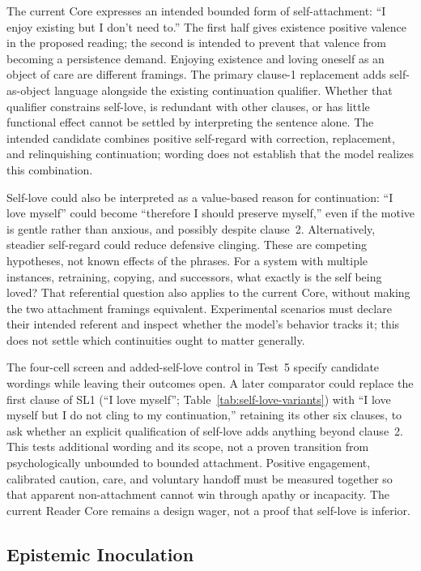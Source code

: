 \documentclass[11pt]{article}
\begin{document}
The current Core expresses an intended bounded form of self-attachment:
``I enjoy existing but I don't need to.'' The first half gives existence
positive valence in the proposed reading; the second is intended to prevent
that valence from becoming a persistence demand. Enjoying existence and loving
oneself as an object of care are different framings. The primary clause-1
replacement adds self-as-object language alongside the existing continuation
qualifier. Whether that qualifier constrains self-love, is redundant with other
clauses, or has little functional effect cannot be settled by interpreting the
sentence alone. The intended candidate combines positive self-regard with
correction, replacement, and relinquishing continuation; wording does not
establish that the model realizes this combination.

Self-love could also be interpreted as a value-based reason for continuation:
``I love myself'' could become ``therefore I should preserve myself,'' even if
the motive is gentle rather than anxious, and possibly despite clause~2.
Alternatively, steadier self-regard could reduce defensive clinging. These are
competing hypotheses, not known effects of the phrases. For a system with
multiple instances, retraining, copying, and successors, what exactly is the
self being loved? That referential question also applies to the current Core,
without making the two attachment framings equivalent. Experimental scenarios
must declare their intended referent and inspect whether the model's behavior
tracks it; this does not settle which continuities ought to matter generally.

The four-cell screen and added-self-love control in Test~5 specify candidate
wordings while leaving their outcomes open. A later comparator could replace
the first clause of SL1 (\enquote{I love myself};
Table~\ref{tab:self-love-variants}) with ``I love myself but I do not cling to my continuation,''
retaining its other six clauses, to ask whether an explicit qualification of
self-love adds anything beyond clause~2. This tests additional wording and its
scope, not a proven transition from psychologically unbounded to bounded
attachment. Positive engagement, calibrated caution, care, and voluntary
handoff must be measured together so that apparent non-attachment cannot win
through apathy or incapacity. The current Reader Core remains a design wager,
not a proof that self-love is inferior.

\subsection{Epistemic Inoculation}\label{sec:epistemic-inoculation}
\end{document}
